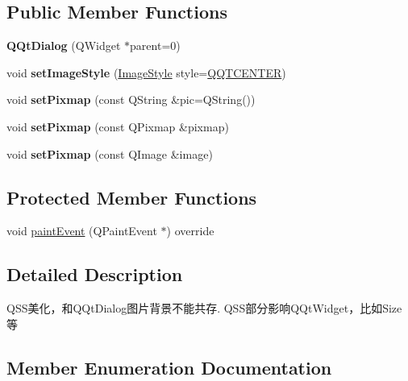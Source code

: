 \subsection*{Public Member Functions}
\begin{DoxyCompactItemize}
\item 
\mbox{\label{class_q_qt_dialog_a5e0de83916d7f093b3f341659473a53b}} 
{\bfseries Q\+Qt\+Dialog} (Q\+Widget $\ast$parent=0)
\item 
\mbox{\label{class_q_qt_dialog_a5a05dc162c599b20f183a56517b2b280}} 
void {\bfseries set\+Image\+Style} (\mbox{\hyperlink{class_q_qt_dialog_a00b7022121843af66df90371b9317412}{Image\+Style}} style=\mbox{\hyperlink{class_q_qt_dialog_a00b7022121843af66df90371b9317412ae861c4431ada9691dad3eb7bdd101e18}{Q\+Q\+T\+C\+E\+N\+T\+ER}})
\item 
\mbox{\label{class_q_qt_dialog_af168b1be3c0bd5684f3347807989129f}} 
void {\bfseries set\+Pixmap} (const Q\+String \&pic=Q\+String())
\item 
\mbox{\label{class_q_qt_dialog_adc48d665b0ba2577e120453e95dd1e98}} 
void {\bfseries set\+Pixmap} (const Q\+Pixmap \&pixmap)
\item 
\mbox{\label{class_q_qt_dialog_af6a79cfd128314fa5361c2162056a8f2}} 
void {\bfseries set\+Pixmap} (const Q\+Image \&image)
\end{DoxyCompactItemize}
\subsection*{Protected Member Functions}
\begin{DoxyCompactItemize}
\item 
void \mbox{\hyperlink{class_q_qt_dialog_a9d4b5c8f382b9861516ac9ec22017719}{paint\+Event}} (Q\+Paint\+Event $\ast$) override
\end{DoxyCompactItemize}


\subsection{Detailed Description}
Q\+S\+S美化，和\+Q\+Qt\+Dialog图片背景不能共存. Q\+S\+S部分影响\+Q\+Qt\+Widget，比如\+Size等 

\subsection{Member Enumeration Documentation}
\mbox{\label{class_q_qt_dialog_a00b7022121843af66df90371b9317412}} 
